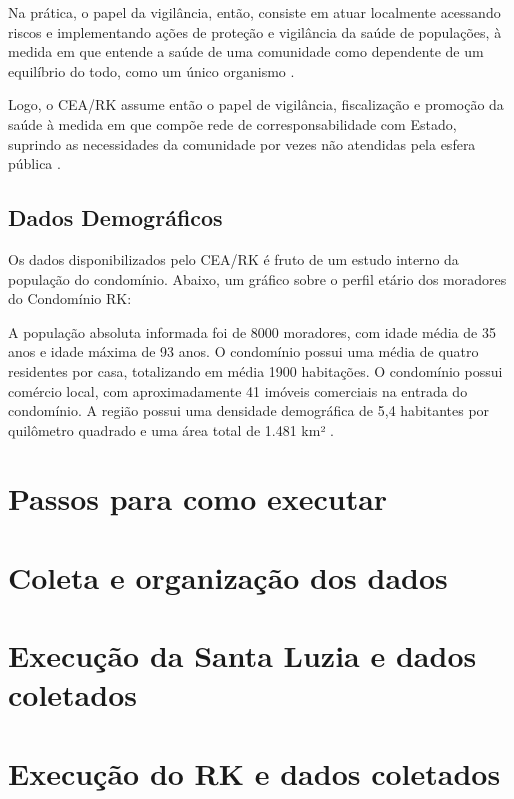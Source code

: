 Na prática, o papel da vigilância, então, consiste em atuar localmente acessando riscos e implementando ações de proteção e vigilância da saúde de populações, à medida em que entende a saúde de uma comunidade como dependente de um equilíbrio do todo, como um único organismo \cite{romao2019aspectos}.

Logo, o CEA/RK assume então o papel de vigilância, fiscalização e promoção da saúde à medida em que compõe rede de corresponsabilidade com Estado, suprindo as necessidades da comunidade por vezes não atendidas pela esfera pública \cite{miranda2020acompanhamento}.

\subsection{Dados Demográficos}

Os dados disponibilizados pelo CEA/RK é fruto de um estudo interno da população do condomínio. Abaixo, um gráfico sobre o perfil etário dos moradores do Condomínio RK:


A população absoluta informada foi de 8000 moradores, com idade média de 35 anos e idade máxima de 93 anos. O condomínio possui uma média de quatro residentes por casa, totalizando em média 1900 habitações. O condomínio possui comércio local, com aproximadamente 41 imóveis comerciais na entrada do condomínio. A região possui uma densidade demográfica de 5,4 habitantes por quilômetro quadrado e uma área total de 1.481 km² \cite{}.






\section{Passos para como executar}
\section{Coleta e organização dos dados}

\section{Execução da Santa Luzia e dados coletados}

\section{Execução do RK e dados coletados}



